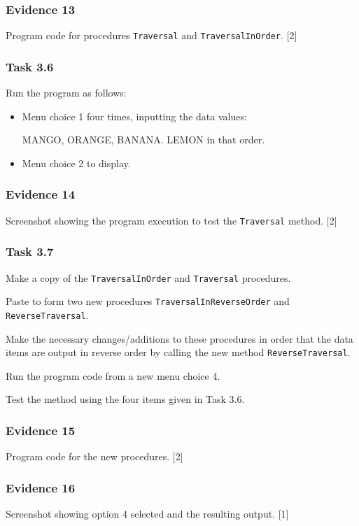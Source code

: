 \subsubsection*{Evidence 13}

Program code for procedures \texttt{Traversal} and \texttt{TraversalInOrder}.\hfill{}
{[}2{]}

\subsubsection*{Task 3.6}

Run the program as follows: 
\begin{itemize}
\item Menu choice 1 four times, inputting the data values: 

MANGO, ORANGE, BANANA. LEMON in that order. 
\item Menu choice 2 to display. 
\end{itemize}

\subsubsection*{Evidence 14}

Screenshot showing the program execution to test the \texttt{Traversal}
method. \hfill{}{[}2{]}

\subsubsection*{Task 3.7}

Make a copy of the \texttt{TraversalInOrder} and \texttt{Traversal}
procedures.

Paste to form two new procedures \texttt{TraversalInReverseOrder}
and \texttt{ReverseTraversal}. 

Make the necessary changes/additions to these procedures in order
that the data items are output in reverse order by calling the new
method \texttt{ReverseTraversal}.

Run the program code from a new menu choice 4.

Test the method using the four items given in Task 3.6.

\subsubsection*{Evidence 15}

Program code for the new procedures. \hfill{}{[}2{]}

\subsubsection*{Evidence 16}

Screenshot showing option 4 selected and the resulting output. \hfill{}{[}1{]}
